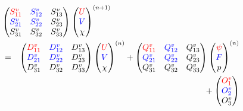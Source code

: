 \begin{eqnarray}
  \label{eq:velocity_advance}
  \lefteqn{
  \begin{pmatrix}
    \cola{S^v_{1 1}} & \colb{S^v_{1 2}} & S^v_{1 3}\\
    \colb{S^v_{2 1}} & \colb{S^v_{2 2}} & S^v_{2 3}\\
          S^v_{3 1}  &       S^v_{3 2}  & S^v_{3 3}\\
  \end{pmatrix} 
  \begin{pmatrix}
    \cola{U}\\ \colb{V}\\ \chi
  \end{pmatrix}^{(n+1)}}\\
  & = & 
  \begin{pmatrix}
    \cola{D^v_{1 1}} & \colb{D^v_{1 2}} & D^v_{1 3}\\
    \colb{D^v_{2 1}} & \colb{D^v_{2 2}} & D^v_{2 3}\\
          D^v_{3 1}  &       D^v_{3 2}  & D^v_{3 3}\\
  \end{pmatrix} 
  \begin{pmatrix}
    \cola{U}\\ \colb{V}\\ \chi
  \end{pmatrix}^{(n)}
  + 
  \begin{pmatrix}
    \cola{Q^v_{1 1}} & \colb{Q^v_{1 2}} & Q^v_{1 3}\\
    \colb{Q^v_{2 1}} & \colb{Q^v_{2 2}} & Q^v_{2 3}\\
          Q^v_{3 1}  &       Q^v_{3 2}  & Q^v_{3 3}\\
  \end{pmatrix} 
  \begin{pmatrix}
    \cola{\psi}\\ \colb{F}\\ p
  \end{pmatrix}^{(n)} \nonumber
  \\ & & \mbox{} + 
  \begin{pmatrix}
    \cola{O^v_{1}}\\
    \colb{O^v_{2}}\\
          O^v_{3} \\
  \end{pmatrix} \nonumber
\end{eqnarray}

